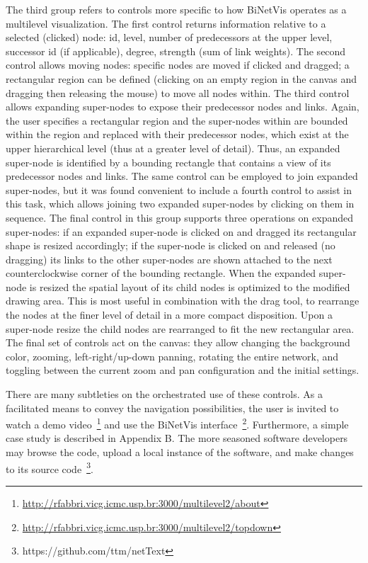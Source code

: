 \documentclass[runningheads]{llncs}
\begin{document}
The third group refers to controls more specific to how BiNetVis operates as a multilevel visualization. 
The first control returns information relative to a selected (clicked) node:
id, level, number of predecessors at the upper level, successor id (if applicable), degree, strength (sum of link weights).
The second control allows moving nodes: specific nodes are moved if clicked and dragged; a rectangular region can be defined (clicking on an empty region in the canvas and dragging then releasing the mouse) to move all nodes within. The third control allows expanding super-nodes to expose their predecessor nodes and links. Again, the user specifies a rectangular region and the super-nodes within are bounded within the region and replaced with their predecessor nodes, which exist at the upper hierarchical level (thus at a greater level of detail). Thus, an expanded super-node is identified by a bounding rectangle that contains a view of its predecessor nodes and links.
The same control can be employed to join expanded super-nodes, but it was found convenient to include a fourth control to assist in this task, which allows joining two expanded super-nodes by clicking on them in sequence.
The final control in this group supports three operations on expanded super-nodes:
if an expanded super-node is clicked on and dragged its rectangular shape is resized accordingly;
if the super-node is clicked on and released (no dragging) its links  to the other super-nodes are shown attached to the next counterclockwise corner of the bounding rectangle.
When the expanded super-node is resized the spatial layout of its child nodes is optimized to the modified drawing area. This is most useful in combination with the drag tool, to rearrange the nodes at the finer level of detail in a more compact disposition.
Upon a super-node resize the child nodes are rearranged to fit the new rectangular area.
The final set of controls act on the canvas: they allow
changing the background color, zooming, left-right/up-down panning,
rotating the entire network, and toggling between the current zoom and pan configuration and the initial settings.

There are many subtleties on the orchestrated use of these controls.
As a facilitated means to convey the navigation possibilities, the user is invited to watch a demo video~\footnote{\url{http://rfabbri.vicg.icmc.usp.br:3000/multilevel2/about}} %
and use the BiNetVis interface~\footnote{\url{http://rfabbri.vicg.icmc.usp.br:3000/multilevel2/topdown}}.
Furthermore, a simple case study is described in Appendix B.
The more seasoned software developers may browse the code, upload a local instance of the software, and make changes to its source code~\footnote{ https://github.com/ttm/netText}.
\end{document}
